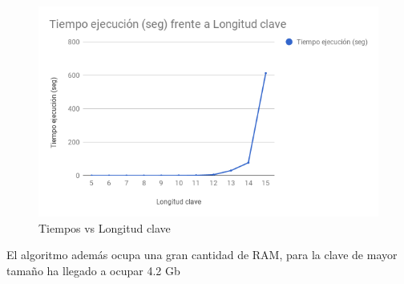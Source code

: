 \begin{figure}[H]
	\includegraphics[width=1\linewidth]{chart}
	\caption{Tiempos vs Longitud clave}
\end{figure}

El algoritmo además ocupa una gran cantidad  de RAM, para la clave de mayor tamaño ha llegado a ocupar 4.2 Gb








